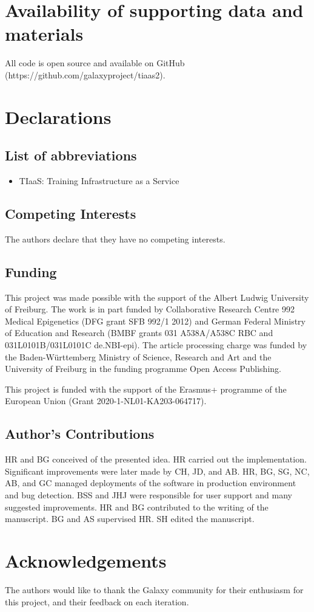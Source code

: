\documentclass[a4paper,num-refs]{oup-contemporary}
\begin{document}
\section{Availability of supporting data and materials}
All code is open source and available on GitHub (https://github.com/galaxyproject/tiaas2).

\section{Declarations}

\subsection{List of abbreviations}
\begin{itemize}
\item TIaaS: Training Infrastructure as a Service
\end{itemize}


\subsection{Competing Interests}
The authors declare that they have no competing interests.

\subsection{Funding}
This project was made possible with the support of the Albert Ludwig University of Freiburg.
The work is in part funded by Collaborative Research Centre 992 Medical Epigenetics (DFG grant SFB 992/1 2012) and German Federal Ministry of Education and Research (BMBF grants 031 A538A/A538C RBC and 031L0101B/031L0101C de.NBI-epi). The article processing charge was funded by the Baden-Württemberg Ministry of Science, Research and Art and the University of Freiburg in the funding programme Open Access Publishing.

This project is funded with the support of the Erasmus+ programme of the European Union (Grant 2020-1-NL01-KA203-064717).

\subsection{Author's Contributions}
HR and BG conceived of the presented idea. HR carried out the implementation. Significant improvements were later made by CH, JD, and AB. HR, BG, SG, NC, AB, and GC managed deployments of the software in production environment and bug detection. BSS and JHJ were responsible for user support and many suggested improvements. HR and BG contributed to the writing of the manuscript. BG and AS supervised HR. SH edited the manuscript.

\section{Acknowledgements}
The authors would like to thank the Galaxy community for their enthusiasm for this project, and their feedback on each iteration.


\end{document}
